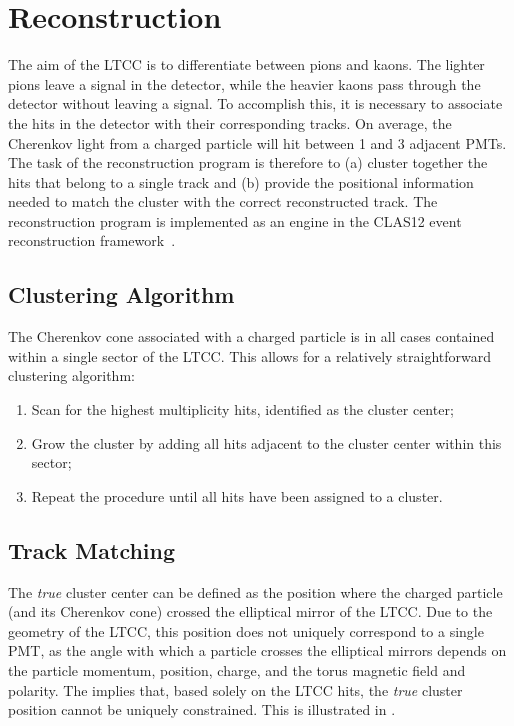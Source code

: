 \section{Reconstruction}

The aim of the LTCC is to differentiate between pions and kaons. The lighter pions leave a signal in the detector, while
the heavier kaons pass through the detector without leaving a signal. To accomplish this, it is necessary to associate the
hits in the detector with their corresponding tracks. On average, the Cherenkov light from a charged particle will hit
between 1 and 3 adjacent PMTs. The task of the reconstruction program is therefore to (a) cluster together the hits
that belong to a single track and (b) provide the positional information needed to match the cluster with the correct
reconstructed track. The reconstruction program is implemented as an engine in the CLAS12 event reconstruction
framework~\cite{recon-nim}.

\subsection{Clustering Algorithm}

The Cherenkov cone associated with a charged particle is in all cases contained within a single sector of the LTCC. This
allows for a relatively straightforward clustering algorithm:

\begin{enumerate}
	\item Scan for the highest multiplicity hits, identified as the cluster center;
    \item Grow the cluster by adding all hits adjacent to the cluster center within this sector;
    \item Repeat the procedure until all hits have been assigned to a cluster.
\end{enumerate}

\subsection{Track Matching}

The \textit{true} cluster center can be defined as the position where the charged particle (and its Cherenkov cone)
crossed the elliptical mirror of the LTCC. Due to the geometry of the LTCC, this position does not uniquely correspond
to a single PMT, as the angle with which a particle crosses the elliptical mirrors depends on the particle momentum,
position, charge, and the torus magnetic field and polarity. The implies that, based solely on the LTCC hits, the
\textit{true} cluster position cannot be uniquely constrained. This is illustrated in .

